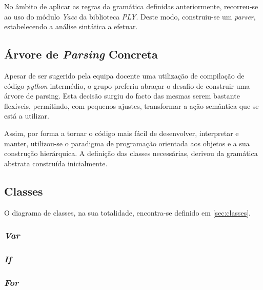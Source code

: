 \documentclass[../relatorio.tex]{subfiles}
\begin{document}

No âmbito de aplicar as regras da gramática definidas anteriormente,
recorreu-se ao uso do módulo \textit{Yacc} da biblioteca \textit{PLY}. 
Deste modo, construiu-se um \textit{parser}, estabelecendo a análise 
sintática a efetuar.

\subsection{Árvore de \textit{Parsing} Concreta}

Apesar de ser sugerido pela equipa docente uma utilização de compilação 
de código \textit{python} intermédio, o grupo preferiu
abraçar o desafio de construir uma árvore de parsing.
Esta decisão surgiu do facto das mesmas serem bastante flexíveis,
permitindo, com pequenos ajustes, transformar a ação semântica que se está 
a utilizar.

Assim, por forma a tornar o código mais fácil de desenvolver, interpretar e manter,
utilizou-se o paradigma de programação orientada aos objetos e a sua construção
hierárquica.
A definição das classes necessárias, derivou da gramática abstrata construída inicialmente.


\subsection{Classes}

O diagrama de classes, na sua totalidade, encontra-se definido em \ref{sec:classes}.

\subsubsection{\textit{Var}} \label{subsec:var}


\subsubsection{\textit{If}} \label{subsec:If}


\subsubsection{\textit{For}}\label{subsec:For}

\end{document}
